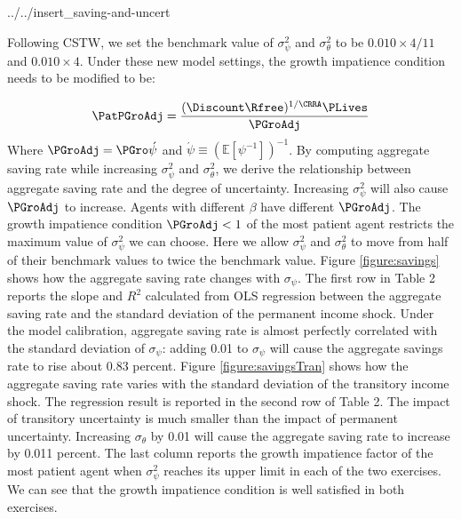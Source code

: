 \documentclass[../../cjSOE.tex]{subfiles}
\begin{document}
\begin{verbatimwrite}{../../insert_saving-and-uncert}

Following CSTW, we set the benchmark value of $\sigma_{\psi}^{2}$ and $\sigma_{\theta}^{2}$ to be $0.010\times4/11$ and $0.010\times4$. Under these new model settings, the growth impatience condition needs to be modified to be:

\begin{align}
	\PatPGroAdj = \frac{(\Discount \Rfree)^{1/\CRRA}\PLives}{\PGroAdj}
\end{align}
Where $\PGroAdj=\PGro \acute{\psi}$ and $\acute{\psi}\equiv (\mathbb{E}[\psi^{-1}])^{-1}$. By computing aggregate saving rate while increasing $\sigma_{\psi}^{2}$ and $\sigma_{\theta}^{2}$,  we derive the relationship between aggregate saving rate and the degree of uncertainty. Increasing $\sigma_{\psi}^{2}$ will also cause $\PGroAdj$ to increase. Agents with different $\beta$ have different $\PGroAdj$. The growth impatience condition $\PGroAdj<1$ of the most patient agent restricts the maximum value of $\sigma_{\psi}^{2}$ we can choose. Here we allow $\sigma_{\psi}^{2}$ and $\sigma_{\theta}^{2}$ to move from half of their benchmark values to twice the benchmark value.  Figure \ref{figure:savings} shows how the aggregate saving rate changes with $\sigma_{\psi}$. The first row in Table 2 reports the slope and $R^2$ calculated from OLS regression between the aggregate saving rate and the standard deviation of the permanent income shock. Under the model calibration, aggregate saving rate is almost perfectly correlated with the standard deviation of $\sigma_{\psi}$: adding 0.01 to $\sigma_{\psi}$ will cause the aggregate savings rate to rise about 0.83 percent. Figure \ref{figure:savingsTran} shows how the aggregate saving rate varies with the standard deviation of the transitory income shock. The regression result is reported in the second row of Table 2. The impact of transitory uncertainty is much smaller than the impact of permanent uncertainty. Increasing  $\sigma_{\theta}$ by 0.01 will cause the aggregate saving rate to increase by 0.011 percent. The last column reports the growth impatience factor of the most patient agent when $\sigma_{\psi}^{2}$ reaches its upper limit in each of the two exercises. We can see that the growth impatience condition is well satisfied in both exercises.
\begin{table}

\end{table}
\end{verbatimwrite}
\end{document}
